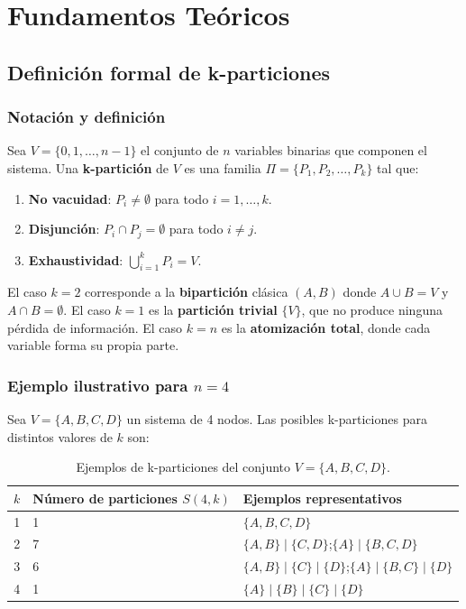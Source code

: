 
\section{Fundamentos Teóricos}

\subsection{Definición formal de k-particiones}

\subsubsection*{Notación y definición}

Sea $V = \{0, 1, \ldots, n-1\}$ el conjunto de $n$ variables binarias que componen el sistema.
Una \textbf{k-partición} de $V$ es una familia $\Pi = \{P_1, P_2, \ldots, P_k\}$ tal que:

\begin{enumerate}
  \item \textbf{No vacuidad}: $P_i \neq \emptyset$ para todo $i = 1, \ldots, k$.
  \item \textbf{Disjunción}: $P_i \cap P_j = \emptyset$ para todo $i \neq j$.
  \item \textbf{Exhaustividad}: $\bigcup_{i=1}^{k} P_i = V$.
\end{enumerate}

El caso $k = 2$ corresponde a la \textbf{bipartición} clásica $(A, B)$ donde $A \cup B = V$ y
$A \cap B = \emptyset$. El caso $k = 1$ es la \textbf{partición trivial} $\{V\}$, que no produce
ninguna pérdida de información. El caso $k = n$ es la \textbf{atomización total}, donde cada
variable forma su propia parte.

\subsubsection*{Ejemplo ilustrativo para $n = 4$}

Sea $V = \{A, B, C, D\}$ un sistema de 4 nodos. Las posibles k-particiones para distintos
valores de $k$ son:

\begin{table}[H]
  \centering
  \caption{Ejemplos de k-particiones del conjunto $V = \{A, B, C, D\}$.}
  \label{tab:ejemplos_kpart}
  \begin{tabular}{clp{7cm}}
    \toprule
    $k$ & Número de particiones $S(4,k)$ & Ejemplos representativos \\
    \midrule
    1 & 1  & $\{A,B,C,D\}$ \\
    2 & 7  & $\{A,B\} \mid \{C,D\}$;\quad $\{A\} \mid \{B,C,D\}$ \\
    3 & 6  & $\{A,B\} \mid \{C\} \mid \{D\}$;\quad $\{A\} \mid \{B,C\} \mid \{D\}$ \\
    4 & 1  & $\{A\} \mid \{B\} \mid \{C\} \mid \{D\}$ \\
    \bottomrule
  \end{tabular}
\end{table}


